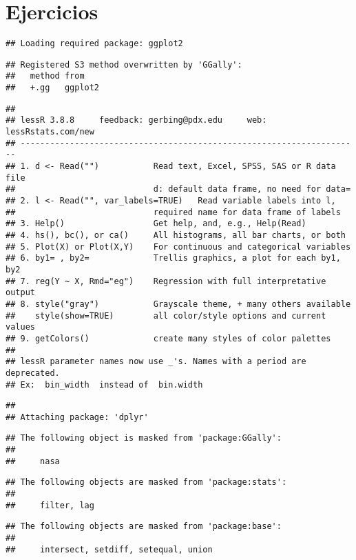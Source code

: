 \documentclass[]{article}
\begin{document}
\section{Ejercicios}\label{ejercicios}

\begin{verbatim}
## Loading required package: ggplot2
\end{verbatim}

\begin{verbatim}
## Registered S3 method overwritten by 'GGally':
##   method from   
##   +.gg   ggplot2
\end{verbatim}

\begin{verbatim}
## 
## lessR 3.8.8     feedback: gerbing@pdx.edu     web: lessRstats.com/new
## ---------------------------------------------------------------------
## 1. d <- Read("")           Read text, Excel, SPSS, SAS or R data file
##                            d: default data frame, no need for data=
## 2. l <- Read("", var_labels=TRUE)   Read variable labels into l,
##                            required name for data frame of labels
## 3. Help()                  Get help, and, e.g., Help(Read)
## 4. hs(), bc(), or ca()     All histograms, all bar charts, or both
## 5. Plot(X) or Plot(X,Y)    For continuous and categorical variables
## 6. by1= , by2=             Trellis graphics, a plot for each by1, by2
## 7. reg(Y ~ X, Rmd="eg")    Regression with full interpretative output
## 8. style("gray")           Grayscale theme, + many others available
##    style(show=TRUE)        all color/style options and current values
## 9. getColors()             create many styles of color palettes
## 
## lessR parameter names now use _'s. Names with a period are deprecated.
## Ex:  bin_width  instead of  bin.width
\end{verbatim}

\begin{verbatim}
## 
## Attaching package: 'dplyr'
\end{verbatim}

\begin{verbatim}
## The following object is masked from 'package:GGally':
## 
##     nasa
\end{verbatim}

\begin{verbatim}
## The following objects are masked from 'package:stats':
## 
##     filter, lag
\end{verbatim}

\begin{verbatim}
## The following objects are masked from 'package:base':
## 
##     intersect, setdiff, setequal, union
\end{verbatim}
\end{document}
